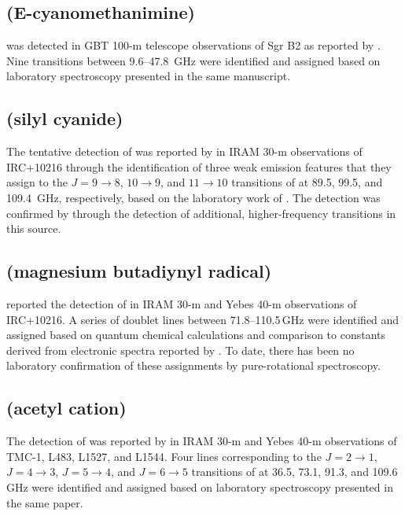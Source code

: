 \documentclass[twocolumn]{aastex631}
\newcommand{\update}[1]{{#1}}
\begin{document}
    \subsection{ (E-cyanomethanimine)}
	\label{HNCHCN}
	
	 was detected in GBT 100-m telescope observations of Sgr B2 as reported by \citet{Zaleski:2013bc}.  Nine transitions between 9.6--47.8~GHz were identified and assigned based on laboratory spectroscopy presented in the same manuscript.
	
	\subsection{ (silyl cyanide)}
	\label{SiH3CN}
	
	The tentative detection of  was reported by \citet{Agundez:2014gm} in IRAM 30-m observations of IRC+10216 through the identification of three weak emission features that they assign to the $J = 9\rightarrow8$, $10\rightarrow9$, and $11\rightarrow10$ transitions of  at 89.5, 99.5, and 109.4~GHz, respectively, based on the laboratory work of \citet{Priem:1998en}.  The detection was confirmed by \citet{Cernicharo:2017gc} through the detection of additional, higher-frequency transitions in this source.
	
	\subsection{\update{ (magnesium butadiynyl radical)}}
	\label{MgC4H}
	
	\update{\citet{Cernicharo:2019ga} reported the detection of \ce{MgC4H} in IRAM 30-m and Yebes 40-m observations of IRC+10216.  A series of doublet lines between {71.8--110.5}\,GHz were identified and assigned based on quantum chemical calculations and comparison to constants derived from electronic spectra reported by \citet{Forthomme:2010dm}.  To date, there has been no laboratory confirmation of these assignments by pure-rotational spectroscopy.}
	
	\subsection{\update{ (acetyl cation)}}
	\label{CH3CO+}
	
	\update{The detection of  was reported by \citet{Cernicharo:2021ol} in IRAM 30-m and Yebes 40-m observations of TMC-1, {L483, L1527, and L1544}.  Four lines corresponding to the $J = 2\rightarrow1$, $J = 4\rightarrow3$, $J = 5\rightarrow4$, and $J = 6\rightarrow5$ transitions of \ce{CH3CO+} at 36.5, 73.1, 91.3, and 109.6\,GHz were identified and assigned based on laboratory spectroscopy presented in the same paper.}
	
\end{document}
